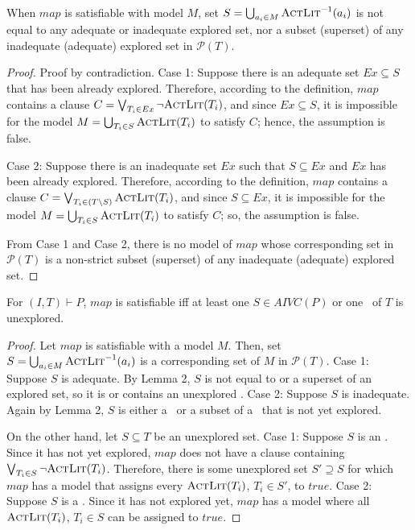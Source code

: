 \begin{lemma}
\label{lem:map:sound}
When $map$ is satisfiable with model $M$, set $S = \bigcup_{a_i \in M} \textsc{ActLit} ^{-1} (a_i)$ is not equal to any adequate or inadequate explored set, nor a subset (superset) of any
inadequate (adequate) explored set in $\mathcal{P}(T)$.
\end{lemma}
\begin{proof}
Proof by contradiction. Case 1: Suppose there is an adequate set $Ex \subseteq S$ that has been already explored. Therefore, according to the definition, $map$ contains a clause $C = \bigvee_{T_{i}\in Ex} \neg {\textsc{ActLit}(T_i)}$, and since $Ex \subseteq S$, it is impossible for the model $M = \bigcup_{T_i \in S} \textsc{ActLit} (T_i)$ to satisfy $C$; hence, the assumption is false.

Case 2: Suppose there is an inadequate set $Ex$ such that $S \subseteq Ex$ and $Ex$ has been already explored. Therefore, according to the definition, $map$ contains a clause $C = \bigvee_{T_{i}\in (T \setminus S)} \textsc{ActLit} (T_i)$, and since $S \subseteq Ex$, it is impossible for the model $M = \bigcup_{T_i \in S} \textsc{ActLit} (T_i)$ to satisfy $C$; so, the assumption is false.

From Case 1 and Case 2, there is no model of $map$ whose corresponding set in $\mathcal{P}(T)$ is a non-strict subset (superset) of any inadequate (adequate) explored set.
\end{proof}


\begin{lemma}
\label{lem:map:comp}
For $(I, T) \vdash P$, $map$ is satisfiable iff
at least one $S \in AIVC(P)$ or one \mis\ of $T$ is unexplored.
\end{lemma}
\begin{proof}
Let $map$ is satisfiable with a model $M$. Then, set
 $S = \bigcup_{a_i \in M} \textsc{ActLit} ^{-1} (a_i)$ is a corresponding set of $M$ in $\mathcal{P}(T)$.
 Case 1: Suppose $S$ is adequate. By Lemma 2, $S$ is not equal to or a superset of an explored set,
 so it is or contains an unexplored \mivc.
Case 2: Suppose $S$ is inadequate. Again by Lemma 2, $S$ is either a \mis\ or a subset of a \mis\ that is not yet explored.

On the other hand, let $S \subseteq T$ be an unexplored set. Case 1: Suppose $S$ is an \mivc.
Since it has not yet explored, $map$ does not have a clause containing $\bigvee_{T_{i}\in S} \neg {\textsc{ActLit}(T_i)}$. Therefore, there is some unexplored set $S' \supseteq S$ for which $map$
has a model that assigns every $\textsc{ActLit} (T_i)$, $T_i\in S'$, to $true$.
Case 2: Suppose $S$ is a \mis. Since it has not explored yet, $map$
has a model where all $\textsc{ActLit} (T_i)$, $T_i\in S$ can be assigned to $true$.
\end{proof}


